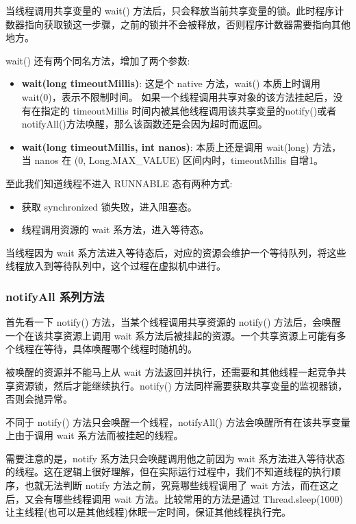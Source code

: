 当线程调用共享变量的 wait() 方法后，只会释放当前共享变量的锁。此时程序计数器指向获取锁这一步骤，之前的锁并不会被释放，否则程序计数器需要指向其他地方。

wait() 还有两个同名方法，增加了两个参数:
\begin{itemize}
    \item \textbf{wait(long timeoutMillis)}: 这是个 native 方法，wait() 本质上时调用 wait(0)，表示不限制时间。 如果一个线程调用共享对象的该方法挂起后，没有在指定的 timeoutMillis 时间内被其他线程调用该共享变量的notify()或者notifyAll()方法唤醒，那么该函数还是会因为超时而返回。
    \item \textbf{wait(long timeoutMillis, int nanos)}: 本质上还是调用 wait(long) 方法，当 nanos 在 (0, Long.MAX\_VALUE) 区间内时，timeoutMillis 自增1。
\end{itemize}

至此我们知道线程不进入 RUNNABLE 态有两种方式:
\begin{itemize}
    \item 获取 synchronized 锁失败，进入阻塞态。
    \item 线程调用资源的 wait 系方法，进入等待态。
\end{itemize}

当线程因为 wait 系方法进入等待态后，对应的资源会维护一个等待队列，将这些线程放入到等待队列中，这个过程在虚拟机中进行。

\subsubsection{notifyAll 系列方法}

首先看一下 notify() 方法，当某个线程调用共享资源的 notify() 方法后，会唤醒一个在该共享资源上调用 wait 系方法后被挂起的资源。一个共享资源上可能有多个线程在等待，具体唤醒哪个线程时随机的。

被唤醒的资源并不能马上从 wait 方法返回并执行，还需要和其他线程一起竞争共享资源锁，然后才能继续执行。notify() 方法同样需要获取共享变量的监视器锁，否则会抛异常。

不同于 notify() 方法只会唤醒一个线程，notifyAll() 方法会唤醒所有在该共享变量上由于调用 wait 系方法而被挂起的线程。

需要注意的是，notify 系方法只会唤醒调用他之前因为 wait 系方法进入等待状态的线程。这在逻辑上很好理解，但在实际运行过程中，我们不知道线程的执行顺序，也就无法判断 notify 方法之前，究竟哪些线程调用了 wait 方法，而在这之后，又会有哪些线程调用 wait 方法。比较常用的方法是通过 Thread.sleep(1000) 让主线程(也可以是其他线程)休眠一定时间，保证其他线程执行完。

